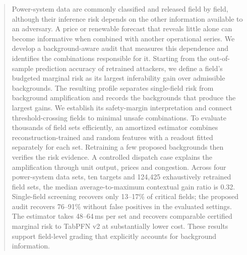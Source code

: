 \begin{abstract}
Power-system data are commonly classified and released field by field, although their inference risk depends on the other information available to an adversary. A price or renewable forecast that reveals little alone can become informative when combined with another operational series. We develop a background-aware audit that measures this dependence and identifies the combinations responsible for it. Starting from the out-of-sample prediction accuracy of retrained attackers, we define a field's budgeted marginal risk as its largest inferability gain over admissible backgrounds. The resulting profile separates single-field risk from background amplification and records the backgrounds that produce the largest gains. We establish its safety-margin interpretation and connect threshold-crossing fields to minimal unsafe combinations. To evaluate thousands of field sets efficiently, an amortized estimator combines reconstruction-trained and random features with a readout fitted separately for each set. Retraining a few proposed backgrounds then verifies the risk evidence. A controlled dispatch case explains the amplification through unit output, prices and congestion. Across four power-system data sets, ten targets and 124,425 exhaustively retrained field sets, the median average-to-maximum contextual gain ratio is 0.32. Single-field screening recovers only 13--17\% of critical fields; the proposed audit recovers 76--91\% without false positives in the evaluated settings. The estimator takes 48--64\,ms per set and recovers comparable certified marginal risk to TabPFN v2 at substantially lower cost. These results support field-level grading that explicitly accounts for background information.
\end{abstract}
